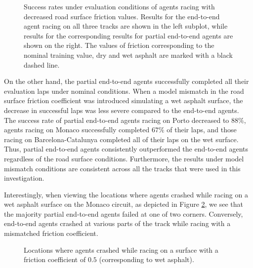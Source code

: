 \begin{figure}[htb!]
    \centering
    
    \caption[Success rate of agents under evaluation conditions with mismatched road surface friction coefficient]{Success rates under evaluation conditions of agents racing with decreased road surface friction values. Results for the end-to-end agent racing on all three tracks are shown in the left subplot, while results for the corresponding results for partial end-to-end agents are shown on the right. The values of friction corresponding to the nominal training value, dry and wet asphalt are marked with a black dashed line.}
    \label{fig:mu}
\end{figure}

On the other hand, the partial end-to-end agents successfully completed all their evaluation laps under nominal conditions. 
When a model mismatch in the road surface friction coefficient was introduced simulating a wet asphalt surface, the decrease in successful laps was less severe compared to the end-to-end agents. 
The success rate of partial end-to-end agents racing on Porto decreased to $88\%$, agents racing on Monaco successfully completed $67\%$ of their laps, and those racing on Barcelona-Catalunya completed all of their laps on the wet surface.
Thus, partial end-to-end agents consistently outperformed the end-to-end agents regardless of the road surface conditions.
Furthermore, the results under model mismatch conditions are consistent across all the tracks that were used in this investigation.

Interestingly, when viewing the locations where agents crashed while racing on a wet asphalt surface on the Monaco circuit, as depicted in Figure \ref{fig:mu_crash_locations}, 
we see that the majority partial end-to-end agents failed at one of two corners.
Conversely, end-to-end agents crashed at various parts of the track while racing with a mismatched friction coefficient.


\begin{figure}[htb!]
    \centering
    
    \caption[Locations where agents crashed while racing on a wet asphalt surface]{Locations where agents crashed while racing on a surface with a friction coefficient of $0.5$ (corresponding to wet asphalt).}
    \label{fig:mu_crash_locations}
\end{figure}


